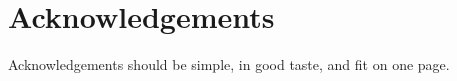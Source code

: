 \chapter*{\centering Acknowledgements}
Acknowledgements should be simple, in good taste, and fit on one page.
